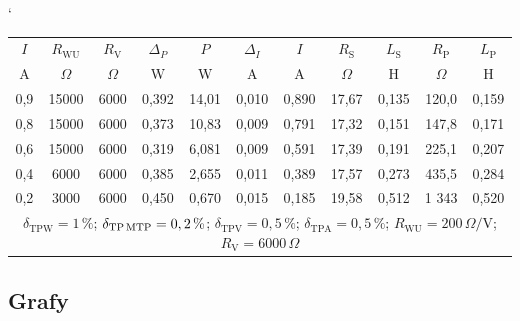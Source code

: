 \documentclass[a4paper, czech]{article}
\begin{document}
\begin{table}[H]
    \catcode`
    \centering
    \begin{tabular}{ccccccccccc}
        \toprule
        $I$   & $R_\text{WU}$   & $R_\text{V}$   & $\Delta_P$    & $P$     & $\Delta_I$    & $I$     & $R_\text{S}$    & $L_\text{S}$    & $R_\text{P}$    & $L_\text{P}$    \\
        \cmidrule(rl){1-1}
        \cmidrule(rl){2-2}
        \cmidrule(rl){3-3}
        \cmidrule(rl){4-4}
        \cmidrule(rl){5-5}
        \cmidrule(rl){6-6}
        \cmidrule(rl){7-7}
        \cmidrule(rl){8-8}
        \cmidrule(rl){9-9}
        \cmidrule(rl){10-10}
        \cmidrule(rl){11-11}
        A   & $\Omega$     & $\Omega$    & W     & W     & A     & A     & $\Omega$     & H     & $\Omega$     & H     \\
        \midrule
        0,9 & 15000 & 6000 & 0,392 & 14,01 & 0,010 & 0,890 & 17,67 & 0,135 & 120,0 & 0,159 \\
        0,8 & 15000 & 6000 & 0,373 & 10,83 & 0,009 & 0,791 & 17,32 & 0,151 & 147,8 & 0,171 \\
        0,6 & 15000 & 6000 & 0,319 & 6,081 & 0,009 & 0,591 & 17,39 & 0,191 & 225,1 & 0,207 \\
        0,4 & 6000  & 6000 & 0,385 & 2,655 & 0,011 & 0,389 & 17,57 & 0,273 & 435,5 & 0,284 \\
        0,2 & 3000  & 6000 & 0,450 & 0,670 & 0,015 & 0,185 & 19,58 & 0,512 & 1 343 & 0,520 \\
        \bottomrule
        \multicolumn{11}{c}{$\delta_\text{TPW} = 1\,\%$; $\delta_\text{TP\,MTP} = 0,2\,\%$; $\delta_\text{TPV} = 0,5\,\%$; $\delta_\text{TPA} = 0,5\,\%$; $R_\text{WU} = 200\,\Omega/\text{V}$; $R_\text{V} = 6000\,\Omega$}
    \end{tabular}
\end{table}

\subsection{Grafy}
\end{document}
